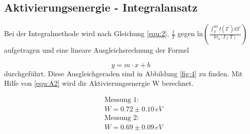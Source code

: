 \subsection{Aktivierungsenergie - Integralansatz}
\label{sec:int}

Bei der Integralmethode wird nach Gleichung \ref{equ:2}, $\frac{1}{T}$ gegen $\text{ln} \left( \frac{\int_{T}^{\inf} I(T^{'}) \text{d}T^{'}}{b \tau_0 \cdot I(T)} \right)$ aufgetragen und eine lineare Ausgleichsrechnung der Formel

\begin{equation}
    y = m \cdot x + b
\end{equation}
durchgeführt.
Diese Ausgleichgeraden sind in Abbildung \ref{fig:4} zu finden.
Mit Hilfe von \ref{equ:A2} wird dir Aktivierungsenergie W berechnet.

\begin{align*}
    &\text{Messung 1:}\\
    & W = 0.72 \pm 0.10 \,eV \\
    &\text{Messung 2:}\\
    & W = 0.69 \pm 0.09 \,eV  \\
\end{align*}

